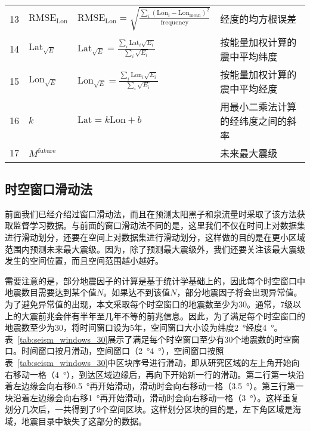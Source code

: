 \begin{sidewaystable}[htpb]
\begin{tabular}{llll}
  13 & $\mathrm{RMSE}_{\mathrm{Lon}}$ & $\displaystyle \mathrm{RMSE}_{\mathrm{Lon}}=\sqrt{\frac{\sum_i{(\mathrm{Lon}_i-\mathrm{Lon}_\mathrm{mean})}^2}{\mathrm{frequency}}}$ &  经度的均方根误差 \\ 
  14 & $\mathrm{Lat}_{\sqrt{E}}$ & $\displaystyle \mathrm{Lat}_{\sqrt{E}}=\frac{\sum_i{\mathrm{Lat}_i\sqrt{E_i}}}{\sum_i{\sqrt{E_i}}}$ & 按能量加权计算的震中平均纬度 \\ 
  15 & $\mathrm{Lon}_{\sqrt{E}}$ & $\displaystyle \mathrm{Lon}_{\sqrt{E}}=\frac{\sum_i{\mathrm{Lon}_i\sqrt{E_i}}}{\sum_i{\sqrt{E_i}}}$ & 按能量加权计算的震中平均经度 \\ 
  16 & $k$ & $\mathrm{Lat}=k\mathrm{Lon}+b$ & 用最小二乘法计算的经纬度之间的斜率 \\
  17 & $M^{\mathrm{future}}$ & & 未来最大震级 \\
  \bottomrule
  \end{tabular} 
\end{sidewaystable}


\subsection{时空窗口滑动法}\label{sec:seis_slide}

前面我们已经介绍过窗口滑动法，而且在预测太阳黑子和泉流量时采取了该方法获取监督学习数据。与前面的窗口滑动法不同的是，这里我们不仅在时间上对数据集进行滑动划分，还要在空间上对数据集进行滑动划分，这样做的目的是在更小区域范围内预测未来最大震级。因为，除了预测最大震级外，我们还要关注该最大震级发生的空间位置，而且空间范围越小越好。

需要注意的是，部分地震因子的计算是基于统计学基础上的，因此每个时空窗口中地震数目需要达到某个值$N$。如果达不到该值$N$，部分地震因子将会出现异常值。为了避免异常值的出现，本文采取每个时空窗口的地震数至少为30。通常，7级以上的大震前兆会伴有半年至几年不等的前兆信息。因此，为了满足每个时空窗口的地震数至少为30，将时间窗口设为5年，空间窗口大小设为纬度\SI{2}{\degree}\times 经度\SI{4}{\degree}。表~\ref{tab:seism_windows_30}展示了满足每个时空窗口至少有30个地震数的时空窗口。时间窗口按月滑动，空间窗口（\SI{2}{\degree}\times \SI{4}{\degree}），空间窗口按照表~\ref{tab:seism_windows_30}中区块序号进行滑动，即从研究区域的左上角开始向右移动一格（\SI{4}{\degree}），到达区域边缘后，再向下开始新一行的滑动。第二行第一块沿着左边缘会向右移\SI{0.5}{\degree}再开始滑动，滑动时会向右移动一格（\SI{3.5}{\degree}）。第三行第一块沿着左边缘会向右移\SI{1}{\degree}再开始滑动，滑动时会向右移动一格（\SI{3}{\degree}）。这样重复划分几次后，一共得到了9个空间区块。这样划分区块的目的是，左下角区域是海域，地震目录中缺失了这部分的数据。

